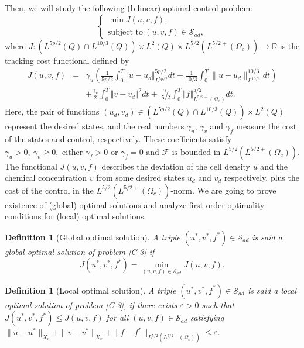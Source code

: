\documentclass[11pt,reqno]{amsart}%
\newtheorem{definition}[theorem]{Definition}
\numberwithin{equation}{section}
\begin{document}
%

Then, we will study the following (bilinear) optimal control problem:
\begin{equation}\label{C-3}
\left\{
\begin{array}{lc}
\min J(u,v,f),\\
\mbox{subject to}\ (u,v,f)\in \mathcal{S}_{ad},
\end{array}
\right.
\end{equation}
where $J: \left(L^{5p/2}(Q)\cap L^{10/3}(Q)\right)\times L^2(Q)\times L^{5/2}(L^{5/2+}(\Omega_c)) \to \mathbb{R}$ is the tracking cost functional defined by 
\begin{eqnarray*}\label{func}
J(u,v,f)&=&\gamma_u\left(\displaystyle\frac{1}{5p/2}\int_{0}^{T}\!\!\Vert u-u_{d}\Vert_{L^{5p/2}}^{5p/2} dt+\frac{1}{10/3}\int_0^T\|u-u_d\|^{10/3}_{L^{10/3}}dt\right)\\
&&+ 
\displaystyle\frac{\gamma_v}{2}\!\int_{0}^{T}\!\!\Vert v-v_{d}\Vert^{2} dt
+
\ \displaystyle\frac{\gamma_f}{5/2}\displaystyle\int_{0}^{T}\!\!\Vert f\Vert _{L^{5/2+}(\Omega_c)}^{5/2} dt.
\end{eqnarray*}
Here, the pair of functions $(u_d,v_d)\in (L^{5p/2}(Q)\cap L^{10/3}(Q))\times L^2(Q)$ represent  the desired states, and the real numbers $\gamma_u$, $\gamma_v$ and $\gamma_f$  measure the cost of the states and control, respectively. These coefficients satisfy
$$
\gamma_u>0,\ \gamma_v\ge 0, \mbox{ either } \gamma_f>0 \mbox{ or } \gamma_f=0 \mbox{ and } \mathcal{F} \mbox{ is bounded in } L^{5/2}(L^{5/2+}(\Omega_c)).
$$
The functional $J(u,v,f)$ describes the deviation of the cell density $u$ and the chemical concentration $v$ from some desired states $u_d$ and $v_d$ respectively, plus the cost of the control in the $L^{5/2}(L^{5/2+}(\Omega_c))$-norm. 
We are going to prove existence of (global) optimal solutions and analyze first order optimality conditions for (local) optimal solutions. 

\begin{definition}[Global optimal solution]\label{opt_sol}
A triple $(u^*,v^*,f^*)\in\mathcal{S}_{ad}$ is said a global optimal solution of problem \eqref{C-3} if
\begin{equation}\label{os-1}
J(u^*,v^*,f^*)=\min_{(u,v,f)\in\mathcal{S}_{ad}}J(u,v,f).
\end{equation}
\end{definition}
\begin{definition}[Local optimal solution]\label{loc_sol}
A triple $(u^*,v^*,f^*)\in\mathcal{S}_{ad}$ is said a local optimal solution of problem \eqref{C-3}, if there exists $\varepsilon>0$ such that  $J(u^*,v^*,f^*)\le J(u,v,f)$ for all $(u,v,f)\in\mathcal{S}_{ad}$ satisfying 
$
\|u-u^*\|_{X_u}+\|v-v^*\|_{X_v}+\|f-f^*\|_{L^{5/2}(L^{5/2+}(\Omega_c))}\le\varepsilon .
$
\end{definition}
\end{document}
